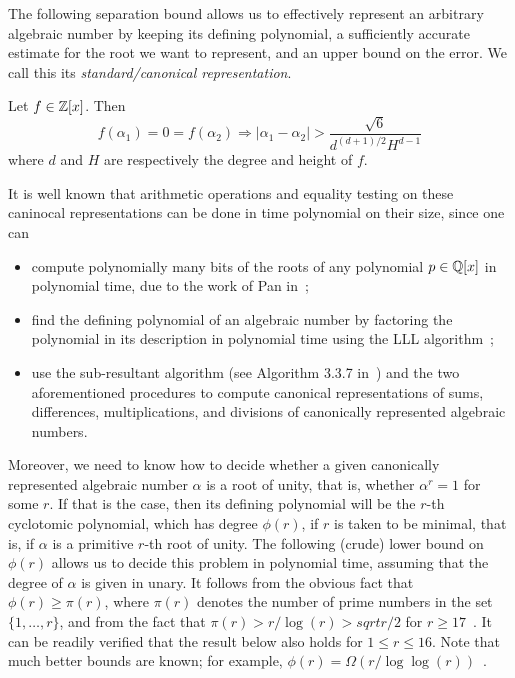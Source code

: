 The following separation bound allows us to effectively represent an arbitrary algebraic number by keeping its defining polynomial, a sufficiently accurate estimate for the root we want to represent, and an upper bound on the error. We call this its \emph{standard/canonical representation}.

\begin{lemma}[Mignotte]
Let $f\in\mathbb{Z}[x]$. Then
\begin{equation}
f(\alpha_1)=0=f(\alpha_2)\Rightarrow \lvert \alpha_1-\alpha_2\rvert>\frac{\sqrt{6}}{d^{(d+1)/2}H^{d-1}}
\end{equation}
where $d$ and $H$ are respectively the degree and height of $f$.
\end{lemma}

It is well known that arithmetic operations and equality testing on these caninocal representations can be done in time polynomial on their size, since one can
\begin{itemize}
\item compute polynomially many bits of the roots of any polynomial $p\in\mathbb{Q}[x]$ in polynomial time, due to the work of Pan in~\cite{Pan97};
\item find the defining polynomial of an algebraic number by factoring the polynomial in its description in polynomial time using the LLL algorithm~\cite{LenstraLenstraLovasz1982};
\item use the sub-resultant algorithm (see Algorithm 3.3.7 in~\cite{Coh93}) and the two aforementioned procedures to compute canonical representations of sums, differences, multiplications, and divisions of canonically represented algebraic numbers.
\end{itemize}

Moreover, we need to know how to decide whether a given canonically represented algebraic number $\alpha$ is a root of unity, that is, whether $\alpha^r=1$ for some $r$. If that is the case, then its defining polynomial will be the $r$-th cyclotomic polynomial, which has degree $\phi(r)$, if $r$ is taken to be minimal, that is, if $\alpha$ is a primitive $r$-th root of unity. The following (crude) lower bound on $\phi(r)$ allows us to decide this problem in polynomial time, assuming that the
degree of $\alpha$ is given in unary. It follows from the obvious fact that $\phi(r) \geq \pi(r)$, where $\pi(r)$ denotes the number of prime numbers in the set $\lbrace 1, \ldots, r \rbrace$, and from the fact that $\pi(r) > r / \log(r) > sqrt{r/2}$ for $r \geq 17$~\cite[Corollary 1]{RS62}. It can be readily verified that the result below also holds for $1 \leq r \leq 16$. Note that much better bounds are known; for example, $\phi(r) = \Omega(r / \log\log(r))$~\cite[Theorem 15]{RS62}.

